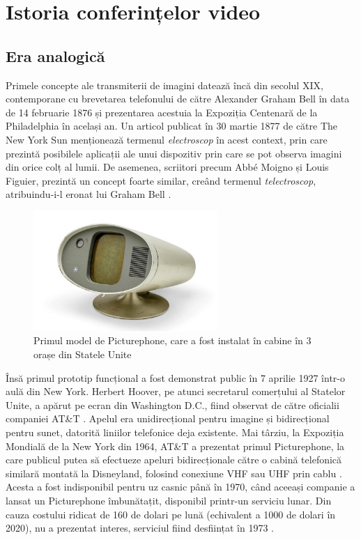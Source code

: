 \chapter{Istoria conferințelor video}
\label{sec:ch2}

\section{Era analogică}
\label{sec:ch2sec1}

\indent \par Primele concepte ale transmiterii de imagini datează încă din secolul XIX, contemporane cu brevetarea telefonului de către Alexander Graham Bell în data de 14 februarie 1876 și prezentarea acestuia la Expoziția Centenară de la Philadelphia în același an. Un articol publicat în 30 martie 1877 de către The New York Sun menționează termenul \textit{electroscop} în acest context, prin care prezintă posibilele aplicații ale unui dispozitiv prin care se pot observa imagini din orice colț al lumii. De asemenea, scriitori precum Abbé Moigno și Louis Figuier, prezintă un concept foarte similar, creând termenul \textit{telectroscop}, atribuindu-i-l eronat lui Graham Bell \cite{Electroscope1878, Telectroscope1877}. 
\begin{figure}[b]
    \centering
    \includegraphics[width=6.99cm]{figures/picturephone.jpg}
    \caption{Primul model de Picturephone, care a fost instalat în cabine în 3 orașe din Statele Unite}
\end{figure}
\indent \par Însă primul prototip funcțional a fost demonstrat public în 7 aprilie 1927 într-o aulă din New York. Herbert Hoover, pe atunci secretarul comerțului al Statelor Unite, a apărut pe ecran din Washington D.C., fiind observat de către oficialii companiei AT\&T \cite{Videophone1927}. Apelul era unidirecțional pentru imagine și bidirecțional pentru sunet, datorită liniilor telefonice deja existente. Mai târziu, la Expoziția Mondială de la New York din 1964, AT\&T a prezentat primul Picturephone, la care publicul putea să efectueze apeluri bidirecționale către o cabină telefonică similară montată la Disneyland, folosind conexiune VHF sau UHF prin cablu \cite{Avoira2020}. Acesta a fost indisponibil pentru uz casnic până în 1970, când aceeași companie a lansat un Picturephone îmbunătațit, disponibil printr-un serviciu lunar. Din cauza costului ridicat de 160 de dolari pe lună (echivalent a 1000 de dolari în 2020), nu a prezentat interes, serviciul fiind desființat în 1973 \cite{Videophone1927}.

